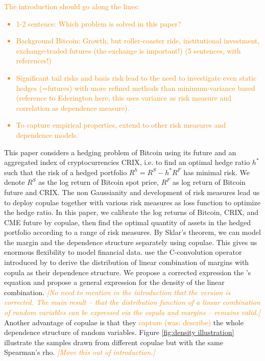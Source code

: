 \documentclass[11pt,a4paper,english]{article}
\providecommand{\natp}[1]{\textcolor{darkorange}{#1}}
\begin{document}
\natp{The introduction should go along the lines:
  \begin{itemize}
  \item 1-2 sentence: Which problem is solved in this paper?
  \item Background Bitcoin: Growth, but roller-coaster ride, institutional investment,
    exchange-traded futures (the exchange is important!) (5 sentences,
    with references!)
  \item Significant tail risks and basis risk lead to the need to
    investigate even static hedges (=futures) with more refined
    methods than minimum-variance based (reference to Ederington
    here; this uses variance as risk measure and correlation as
    dependence measure).
  \item To capture empirical properties, extend to other risk measures
    and dependence models. 
  \end{itemize}
  }

This paper considers a hedging problem of Bitcoin using its future and an aggregated index of cryptocurrencies CRIX,
i.e. to find an optimal hedge ratio $h^*$ such that the risk of a hedged portfolio $R^h = R^S - h^*R^F$ has
minimal risk.
We denote $R^S$ as the log return of Bitcoin spot price, $R^F$ as log return of Bitcoin future and CRIX.
The non Gaussianity and development of risk measures lead us to deploy copulae together with various risk measures as loss function to optimize the hedge ratio.
In this paper, we calibrate the log returns of Bitcoin, CRIX, and CME future by copulae,
then find the optimal quantity of assets in the hedged portfolio according to a range of risk measures.
By Sklar's theorem, we can model the margin and the dependence structure separately using copulae.
This gives us enormous flexibility to model financial data.
\citet{barbi2014copula} use the C-convolution operator introduced by \citet{cherubini2011copula} to derive the distribution
of linear combination of margins with copula as their dependence structure.
We propose a corrected expression the \citet{barbi2014copula}'s equation and propose a general expression for the density of the linear
combination. \natp{\em [No need to mention in the introduction that
  the version is corrected. The main result -- that the distribution
  function of a linear combination of random variables can be
  expressed via the copula and margins -- remains valid.]}\medskip
Another advantage of copulae is that they \natp{capture (was: describe)} the whole dependence structure of random variables.
Figure \ref{fig:density illustration} illustrate the samples drawn
from different copulae but with the same Spearman's rho. \natp{\em
  [Move this out of introduction.]}
\end{document}
